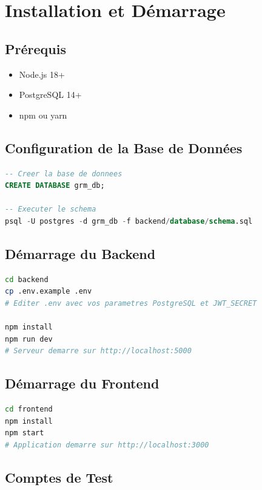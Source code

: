 \section{Installation et Démarrage}

\subsection{Prérequis}

\begin{itemize}
    \item Node.js 18+
    \item PostgreSQL 14+
    \item npm ou yarn
\end{itemize}

\subsection{Configuration de la Base de Données}

\begin{lstlisting}[language=SQL, caption={Initialisation}]
-- Creer la base de donnees
CREATE DATABASE grm_db;

-- Executer le schema
psql -U postgres -d grm_db -f backend/database/schema.sql
\end{lstlisting}

\subsection{Démarrage du Backend}

\begin{lstlisting}[language=bash, caption={Backend setup}]
cd backend
cp .env.example .env
# Editer .env avec vos parametres PostgreSQL et JWT_SECRET

npm install
npm run dev
# Serveur demarre sur http://localhost:5000
\end{lstlisting}

\subsection{Démarrage du Frontend}

\begin{lstlisting}[language=bash, caption={Frontend setup}]
cd frontend
npm install
npm start
# Application demarre sur http://localhost:3000
\end{lstlisting}

\subsection{Comptes de Test}

